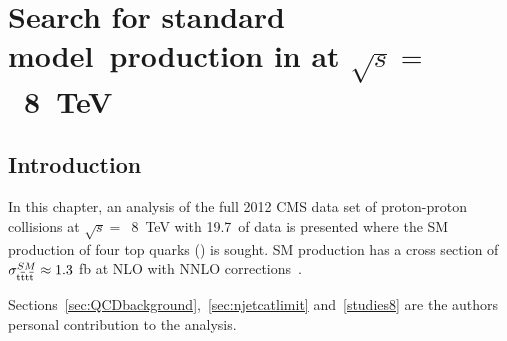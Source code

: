 \chapter{Search for standard model~\tttt production in \runone at $\sqrt{s} =$~8~TeV }
\label{c:Run1}

\section{Introduction}
In this chapter, an analysis of the full 2012 CMS data set of proton-proton collisions at $\sqrt{s} =$~8~TeV with 19.7~\fbinv of data is presented where the SM production of four top quarks (\tttt) is sought. SM \tttt production has a cross section of $\sigma_{{\mathrm{t}\overline{\mathrm{t}}\mathrm{t}\overline{\mathrm{t}}}}^{SM}  \approx 1.3$ fb at NLO with NNLO corrections~\cite{Barger201070,Bevilacqua2012}. 



Sections~\ref{sec:QCDbackground},~\ref{sec:njetcatlimit} and~\ref{studies8} are the authors personal contribution to the analysis.

